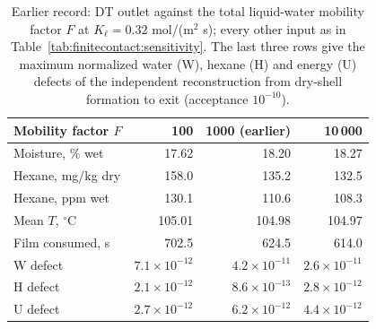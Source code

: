 \begin{table}[htbp]\centering\small
\caption{Earlier record: DT outlet against the total liquid-water mobility factor $F$ at
$K_\ell=0.32$ mol/(m$^2$ s); every other input as in
Table~\ref{tab:finitecontact:sensitivity}. The last three rows give the
maximum normalized water (W), hexane (H) and energy (U) defects of the
independent reconstruction from dry-shell formation to exit (acceptance
$10^{-10}$).}
\label{tab:finitecontact:factormarch}
\begin{tabular}{@{}lrrr@{}}\toprule
Mobility factor $F$ & 100 & 1000 (earlier) & 10\,000\\\midrule
Moisture, \% wet & 17.62 & 18.20 & 18.27\\
Hexane, mg/kg dry & 158.0 & 135.2 & 132.5\\
Hexane, ppm wet & 130.1 & 110.6 & 108.3\\
Mean $T$, $^\circ$C & 105.01 & 104.98 & 104.97\\
Film consumed, s & 702.5 & 624.5 & 614.0\\
W defect & $7.1\times10^{-12}$ & $4.2\times10^{-11}$ & $2.6\times10^{-11}$\\
H defect & $2.1\times10^{-12}$ & $8.6\times10^{-13}$ & $2.8\times10^{-12}$\\
U defect & $2.7\times10^{-12}$ & $6.2\times10^{-12}$ & $4.4\times10^{-12}$\\
\bottomrule\end{tabular}\end{table}

